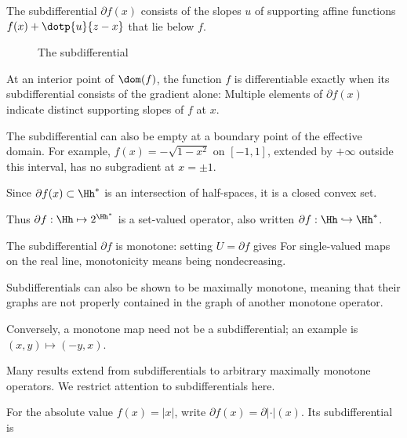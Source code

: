The subdifferential $\partial f(x)$ consists of the slopes $u$ of supporting affine functions $f(x) + \dotp{u}{z-x}$ that lie below $f$.


\begin{figure}[tbp]
\centering
{}
\caption{The subdifferential}
\label{fig-review-convex-analysis-subdifferential}
\end{figure}
At an interior point of $\dom(f)$, the function $f$ is differentiable exactly when its subdifferential consists of the gradient alone:
Multiple elements of $\partial f(x)$ indicate distinct supporting slopes of $f$ at $x$.

The subdifferential can also be empty at a boundary point of the effective domain. For example, $f(x)=-\sqrt{1-x^2}$ on $[-1,1]$, extended by $+\infty$ outside this interval, has no subgradient at $x=\pm1$.

Since $\partial f(x) \subset \Hh^*$ is an intersection of half-spaces, it is a closed convex set.
                                                      
 
Thus $\partial f : \Hh \mapsto 2^{\Hh^*}$ is a set-valued operator, also written $\partial f : \Hh \hookrightarrow \Hh^*$.

\begin{rem}
The subdifferential $\partial f$ is monotone: setting $U=\partial f$ gives
For single-valued maps on the real line, monotonicity means being nondecreasing.
 
Subdifferentials can also be shown to be maximally monotone, meaning that their graphs are not properly contained in the graph of another monotone operator.
 
Conversely, a monotone map need not be a subdifferential; an example is $(x,y) \mapsto (-y,x)$.
  
Many results extend from subdifferentials to arbitrary maximally monotone operators. We restrict attention to subdifferentials here.
\end{rem}

For the absolute value $f(x)=|x|$, write $\partial f(x) = \partial |\cdot|(x)$. Its subdifferential is

